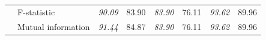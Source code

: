 \documentclass{llncs}
\begin{document}
\begin{table}
\begin{tabular}{|r|l|p{1.2cm}|p{1.2cm}|p{1.2cm}|p{1.2cm}|p{1.2cm}|p{1.2cm}|}
                                                     & F-statistic                                           & \textit{90.09}                      & 83.90                              & \textit{83.90}                      & 76.11                              & \textit{93.62}                      & 89.96                              \\
                                                     & Mutual information                                    & \textit{91.44}                      & 84.87                              & \textit{83.90}                      & 76.11                              & \textit{93.62}                      & 89.96                          \\    

                                                     \hline                     
\end{tabular}
\end{table}
\end{document}
